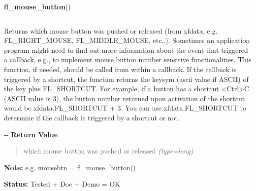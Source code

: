 \hspace{.8\funcindent}\begin{boxedminipage}{\funcwidth}

    \raggedright \textbf{fl\_mouse\_button}()

    \vspace{-1.5ex}

    \rule{\textwidth}{0.5\fboxrule}
\setlength{\parskip}{2ex}

Returns which mouse button was pushed or released (from xfdata, e.g.
FL\_RIGHT\_MOUSE, FL\_MIDDLE\_MOUSE, etc..). Sometimes an application program
might need to find out more information about the event that triggered a
callback, e.g., to implement mouse button number sensitive functionalities.
This function, if needed, should be called from within a callback. If the
callback is triggered by a shortcut, the function returns the keysym
(ascii value if ASCII) of the key plus FL\_SHORTCUT. For example, if a
button has a shortcut <Ctrl>C (ASCII value is 3), the button number
returned upon activation of the shortcut would be xfdata.FL\_SHORTCUT + 3.
You can use xfdata.FL\_SHORTCUT to determine if the callback is triggered
by a shortcut or not.

-{}-
\setlength{\parskip}{1ex}
      \textbf{Return Value}
    \vspace{-1ex}

      \begin{quote}

which mouse button was pushed or released
      {\it (type=long)}

      \end{quote}

\textbf{Note:} 
e.g. mousebtn = fl\_mouse\_button()


\textbf{Status:} 
Tested + Doc + Demo = OK


    \end{boxedminipage}

    \label{xformslib:flbasic:fl_mouse_button}

    \vspace{0.5ex}

